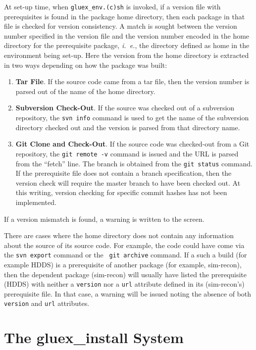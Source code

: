 \documentclass[12pt]{article}
\begin{document}
At set-up time, when {\tt gluex\_env.(c)sh} is invoked, if a version
file with prerequisites is found in the package home directory, then
each package in that file is checked for version consistency. A match
is sought between the version number specified in the version file and
the version number encoded in the home directory for the prerequisite
package, {\it i.~e.}, the directory defined as home in the environment
being set-up. Here the version from the home directory is extracted in
two ways depending on how the package was built:
\begin{enumerate}

\item {\bf Tar File}. If the source code came from a tar file, then
  the version number is parsed out of the name of the home directory.

\item {\bf Subversion Check-Out}. If the source was checked out of a
  subversion repository, the {\tt svn info} command is used to get the
  name of the subversion directory checked out and the version is
  parsed from that directory name.

\item {\bf Git Clone and Check-Out}. If the source code was
  checked-out from a Git repository, the {\tt git remote -v} command
  is issued and the URL is parsed from the ``fetch'' line. The branch
  is obtained from the {\tt git status} command. If the prerequisite
  file does not contain a branch specification, then the version check
  will require the master branch to have been checked out. At this
  writing, version checking for specific commit hashes has not been
  implemented.

\end{enumerate}
If a version mismatch is found, a warning is written to the screen.

There are cases where the home directory does not contain any
information about the source of its source code. For example, the code
could have come via the {\tt svn\ export} command or the {\tt
  git\ archive} command. If a such a build (for example HDDS) is a
prerequisite of another package (for example, sim-recon), then the
dependent package (sim-recon) will usually have listed the
prerequisite (HDDS) with neither a {\tt version} nor a {\tt url}
attribute defined in its (sim-recon's) prerequisite file. In that
case, a warning will be issued noting the absence of both {\tt
  version} and {\tt url} attributes.

\section{The gluex\_install System}
\end{document}
